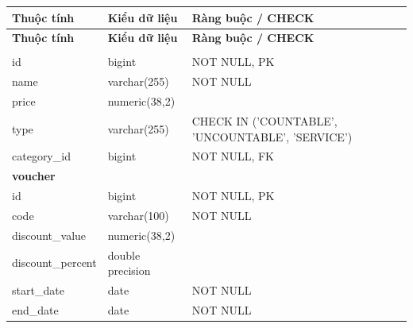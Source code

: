 \begin{longtable}{|p{3.5cm}|p{3.5cm}|p{7.5cm}|}
	\hline
	\textbf{Thuộc tính} & \textbf{Kiểu dữ liệu} & \textbf{Ràng buộc / CHECK}                                            \\
	\hline
	\endfirsthead

	\hline
	\textbf{Thuộc tính} & \textbf{Kiểu dữ liệu} & \textbf{Ràng buộc / CHECK}                                            \\
	\hline
	\endhead

	\hline
	\endfoot

	\hline
	\endlastfoot

	\multicolumn{3}{|l|}{\textbf{product}}                                                                              \\
	\hline
	id                  & bigint                & NOT NULL, PK                                                          \\
	name                & varchar(255)          & NOT NULL                                                              \\
	price               & numeric(38,2)         &                                                                       \\
	type                & varchar(255)          & CHECK IN ('COUNTABLE', 'UNCOUNTABLE', 'SERVICE')                      \\
	category\_id        & bigint                & NOT NULL, FK                                                          \\
	\hline

	\multicolumn{3}{|l|}{\textbf{voucher}}                                                                              \\
	\hline
	id                  & bigint                & NOT NULL, PK                                                          \\
	code                & varchar(100)          & NOT NULL                                                              \\
	discount\_value     & numeric(38,2)         &                                                                       \\
	discount\_percent   & double precision      &                                                                       \\
	start\_date         & date                  & NOT NULL                                                              \\
	end\_date           & date                  & NOT NULL                                                              \\
	\hline


\end{longtable}
